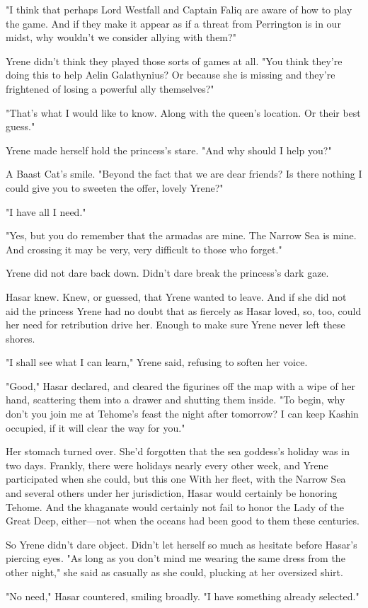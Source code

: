 "I think that perhaps Lord Westfall and Captain Faliq are aware of how to play the game. And if they make it appear as if a threat from Perrington is in our midst, why wouldn't we consider allying with them?"

Yrene didn't think they played those sorts of games at all. "You think they're doing this to help Aelin Galathynius? Or because she is missing and they're frightened of losing a powerful ally themselves?"

"That's what I would like to know. Along with the queen's location. Or their best guess."

Yrene made herself hold the princess's stare. "And why should I help you?"

A Baast Cat's smile. "Beyond the fact that we are dear friends? Is there nothing I could give you to sweeten the offer, lovely Yrene?"

"I have all I need."

"Yes, but you do remember that the armadas are mine. The Narrow Sea is mine. And crossing it may be very, very difficult to those who forget."

Yrene did not dare back down. Didn't dare break the princess's dark gaze.

Hasar knew. Knew, or guessed, that Yrene wanted to leave. And if she did not aid the princess  Yrene had no doubt that as fiercely as Hasar loved, so, too, could her need for retribution drive her. Enough to make sure Yrene never left these shores.

"I shall see what I can learn," Yrene said, refusing to soften her voice.

"Good," Hasar declared, and cleared the figurines off the map with a wipe of her hand, scattering them into a drawer and shutting them inside. "To begin, why don't you join me at Tehome's feast the night after tomorrow? I can keep Kashin occupied, if it will clear the way for you."

Her stomach turned over. She'd forgotten that the sea goddess's holiday was in two days. Frankly, there were holidays nearly every other week, and Yrene participated when she could, but this one  With her fleet, with the Narrow Sea and several others under her jurisdiction, Hasar would certainly be honoring Tehome. And the khaganate would certainly not fail to honor the Lady of the Great Deep, either---not when the oceans had been good to them these centuries.

So Yrene didn't dare object. Didn't let herself so much as hesitate before Hasar's piercing eyes. "As long as you don't mind me wearing the same dress from the other night," she said as casually as she could, plucking at her oversized shirt.

"No need," Hasar countered, smiling broadly. "I have something already selected."

